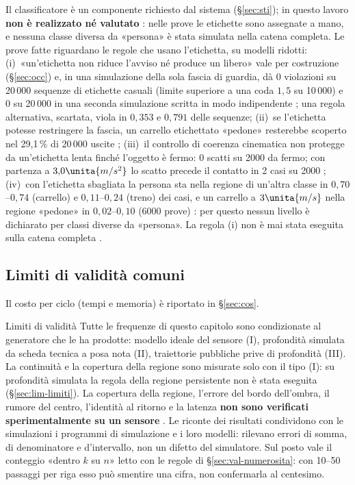 Il classificatore è un componente richiesto dal sistema (\S\ref{sec:sti}); in questo lavoro \textbf{non è realizzato né valutato} : nelle prove le etichette sono assegnate a mano, e nessuna classe diversa da «persona» è stata simulata nella catena completa. Le prove fatte riguardano le regole che usano l'etichetta, su modelli ridotti: (i)~«un'etichetta non riduce l'avviso né produce un libero» vale per costruzione (\S\ref{sec:occ}) e, in una simulazione della sola fascia di guardia, dà 0 violazioni su 20\,000 sequenze di etichette casuali (limite superiore a una coda $1{,}5$ su 10\,000) e 0 su 20\,000 in una seconda simulazione scritta in modo indipendente ; una regola alternativa, scartata, viola in $0{,}353$ e $0{,}791$ delle sequenze; (ii)~se l'etichetta potesse restringere la fascia, un carrello etichettato «pedone» resterebbe scoperto nel 29,1\,\% di 20\,000 uscite ; (iii)~il controllo di coerenza cinematica non protegge da un'etichetta lenta finché l'oggetto è fermo: 0 scatti su 2000 da fermo; con partenza a $3{,}0\unita{m/s^2}$ lo scatto precede il contatto in 2 casi su 2000 ; (iv)~con l'etichetta sbagliata la persona sta nella regione di un'altra classe in $0{,}70$–$0{,}74$ (carrello) e $0{,}11$–$0{,}24$ (treno) dei casi, e un carrello a $3\unita{m/s}$ nella regione «pedone» in $0{,}02$–$0{,}10$ (6000 prove) : per questo nessun livello è dichiarato per classi diverse da «persona». La regola (i) non è mai stata eseguita sulla catena completa .

\subsection{Limiti di validità comuni}\label{sec:val-limiti}

Il costo per ciclo (tempi e memoria) è riportato in \S\ref{sec:cos}.
\begin{riquadro}{Limiti di validità}
Tutte le frequenze di questo capitolo sono condizionate al generatore che le ha prodotte: modello ideale del sensore (I), profondità simulata da scheda tecnica a posa nota (II), traiettorie pubbliche prive di profondità (III). La continuità e la copertura della regione sono misurate solo con il tipo (I): su profondità simulata la regola della regione persistente non è stata eseguita (\S\ref{sec:lim-limiti}). La copertura della regione, l'errore del bordo dell'ombra, il rumore del centro, l'identità al ritorno e la latenza \textbf{non sono verificati sperimentalmente su un sensore} . Le riconte dei risultati condividono con le simulazioni i programmi di simulazione e i loro modelli: rilevano errori di somma, di denominatore e d'intervallo, non un difetto del simulatore. Sul posto vale il conteggio «dentro $k$ su $n$» letto con le regole di \S\ref{sec:val-numerosita}: con 10–50 passaggi per riga esso può smentire una cifra, non confermarla al centesimo.
\end{riquadro}

